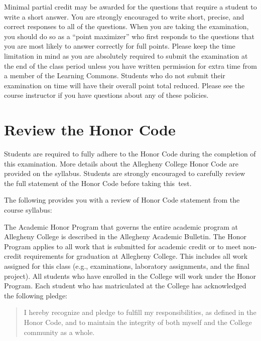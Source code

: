 \vspace*{-.05in}
\noindent Minimal partial credit may be awarded for the questions that require a student to write a short answer. You
are strongly encouraged to write short, precise, and correct responses to all of the questions. When you are taking the
examination, you should do so as a ``point maximizer'' who first responds to the questions that you are most likely to
answer correctly for full points. Please keep the time limitation in mind as you are absolutely required to submit the
examination at the end of the class period unless you have written permission for extra time from a member of the
Learning Commons. Students who do not submit their examination on time will have their overall point total reduced.
Please see the course instructor if you have questions about any of these policies.

\vspace*{-.2in}
\section*{Review the Honor Code}
\vspace*{-.1in}

\noindent Students are required to fully adhere to the Honor Code during the completion of this examination. More
details about the Allegheny College Honor Code are provided on the syllabus. Students are strongly encouraged to
carefully review the full statement of the Honor Code before taking \mbox{this test}.

\noindent The following provides you with a review of Honor Code statement from the course syllabus:

The Academic Honor Program that governs the entire academic program at Allegheny College is described in the Allegheny
Academic Bulletin.  The Honor Program applies to all work that is submitted for academic credit or to meet non-credit
requirements for graduation at Allegheny College.  This includes all work assigned for this class (e.g., examinations,
laboratory assignments, and the final project).  All students who have enrolled in the College will work under the Honor
Program.  Each student who has matriculated at the College has acknowledged the following pledge:

\vspace*{-.11in}
\begin{quote}
  I hereby recognize and pledge to fulfill my responsibilities, as defined in the Honor Code, and to maintain the
  integrity of both myself and the College community as a whole.
\end{quote}
\vspace*{-.11in}

